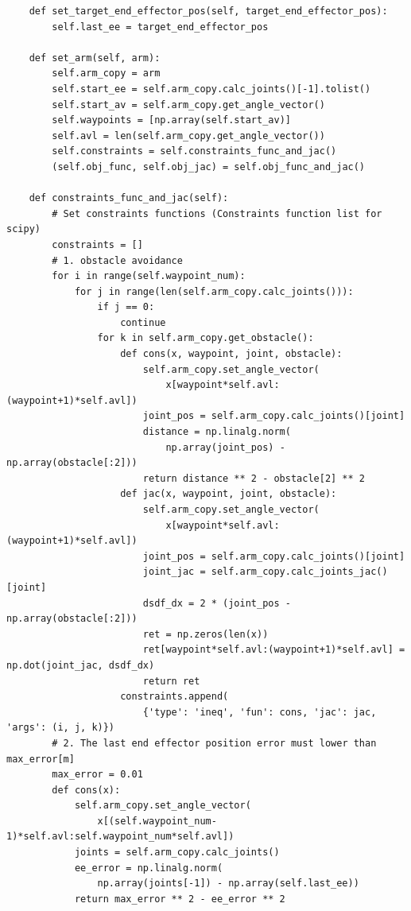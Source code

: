 \begin{verbatim}
    def set_target_end_effector_pos(self, target_end_effector_pos):
        self.last_ee = target_end_effector_pos

    def set_arm(self, arm):
        self.arm_copy = arm
        self.start_ee = self.arm_copy.calc_joints()[-1].tolist()
        self.start_av = self.arm_copy.get_angle_vector()
        self.waypoints = [np.array(self.start_av)]
        self.avl = len(self.arm_copy.get_angle_vector())
        self.constraints = self.constraints_func_and_jac()
        (self.obj_func, self.obj_jac) = self.obj_func_and_jac()

    def constraints_func_and_jac(self):
        # Set constraints functions (Constraints function list for scipy)
        constraints = []
        # 1. obstacle avoidance
        for i in range(self.waypoint_num):
            for j in range(len(self.arm_copy.calc_joints())):
                if j == 0:
                    continue
                for k in self.arm_copy.get_obstacle():
                    def cons(x, waypoint, joint, obstacle):
                        self.arm_copy.set_angle_vector(
                            x[waypoint*self.avl:(waypoint+1)*self.avl])
                        joint_pos = self.arm_copy.calc_joints()[joint]
                        distance = np.linalg.norm(
                            np.array(joint_pos) - np.array(obstacle[:2]))
                        return distance ** 2 - obstacle[2] ** 2
                    def jac(x, waypoint, joint, obstacle):
                        self.arm_copy.set_angle_vector(
                            x[waypoint*self.avl:(waypoint+1)*self.avl])
                        joint_pos = self.arm_copy.calc_joints()[joint]
                        joint_jac = self.arm_copy.calc_joints_jac()[joint]
                        dsdf_dx = 2 * (joint_pos - np.array(obstacle[:2]))
                        ret = np.zeros(len(x))
                        ret[waypoint*self.avl:(waypoint+1)*self.avl] = np.dot(joint_jac, dsdf_dx)
                        return ret
                    constraints.append(
                        {'type': 'ineq', 'fun': cons, 'jac': jac, 'args': (i, j, k)})
        # 2. The last end effector position error must lower than max_error[m]
        max_error = 0.01
        def cons(x):
            self.arm_copy.set_angle_vector(
                x[(self.waypoint_num-1)*self.avl:self.waypoint_num*self.avl])
            joints = self.arm_copy.calc_joints()
            ee_error = np.linalg.norm(
                np.array(joints[-1]) - np.array(self.last_ee))
            return max_error ** 2 - ee_error ** 2

\end{verbatim}
